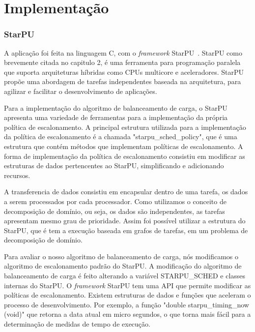 \pagestyle{empty}
\cleardoublepage
\pagestyle{fancy}

\chapter{Implementação}\label{cap5}



\subsection{StarPU}

A aplicação foi feita na linguagem C, com o \emph{framework} StarPU~\citep{starpu}. StarPU  como brevemente citada no capitulo 2, é uma ferramenta para programação paralela que suporta arquiteturas híbridas como CPUs multicore e aceleradores.  StarPU propõe 
uma abordagem de tarefas independentes baseada na arquitetura, para agilizar e facilitar o desenvolvimento de aplicações.

Para a implementação do algoritmo de balanceamento de carga, o StarPU apresenta uma variedade de ferramentas para a implementação da própria política de escalonamento. A principal estrutura utilizada para a implementação da política de escalonamento é a chamada "starpu\_sched\_policy", que é uma estrutura que contém métodos que implementam políticas de escalonamento. A forma de implementação da política de escalonamento consistiu em modificar as estruturas de dados pertencentes ao StarPU, simplificando e adicionando recursos. 

A transferencia de dados consistiu em encapsular dentro de uma tarefa, os dados a serem processados por cada processador. Como utilizamos o conceito de decomposição de domínio, ou seja, os dados são independentes, as tarefas apresentam mesmo grau de prioridade. Assim foi possível utilizar a estrutura do StarPU, que é tem a execução baseada em grafos de tarefas, em um problema de decomposição de domínio. 

Para avaliar o nosso algoritmo de balanceamento de carga, nós modificamos o algoritmo de escalonamento padrão do StarPU. A modificação do algoritmo de balanceamento de carga é feito  alterando a variável STARPU\_SCHED e classes internas do StarPU. O \emph{framework} StarPU tem uma API que permite modificar as políticas de escalonamento. Existem estruturas de dados e funções que aceleram o processo de desenvolvimento. Por exemplo, a função "double starpu\_timing\_now (void)" que retorna a data atual em micro segundos, o que torna mais fácil para a determinação de medidas de tempo de execução. 


